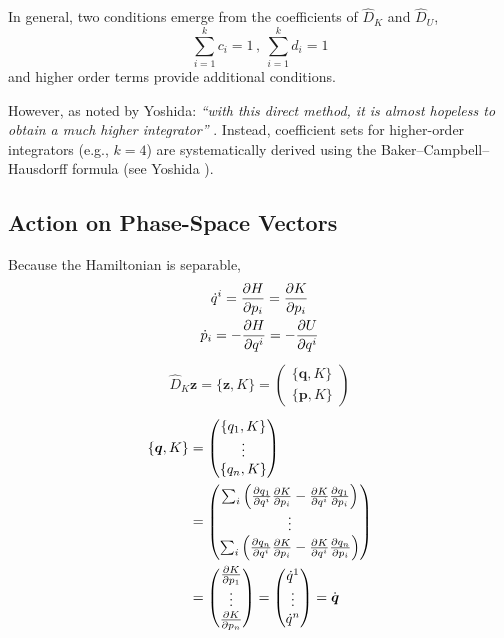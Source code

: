 \documentclass{article}
\renewcommand{\vec}[1]{\boldsymbol{#1}}
\begin{document}
In general, two conditions emerge from the coefficients of $\hat{D}_K$ and $\hat{D}_U$,
\[ \sum_{i=1}^{k} c_i = 1 \, , \ \sum_{i=1}^{k} d_i = 1 \]
and higher order terms provide additional conditions.

However, as noted by Yoshida: \textit{``with this direct method, it is almost hopeless to obtain a much higher integrator''} \cite{YOSHIDA1990262}.
Instead, coefficient sets for higher-order integrators (e.g., $k=4$) are systematically derived using the Baker--Campbell--Hausdorff formula (see Yoshida \cite{YOSHIDA1990262}).

\subsection{Action on Phase-Space Vectors}
Because the Hamiltonian is separable,
\begin{gather*}
	\dot{q}^i = \pdv{H}{p_i} = \pdv{K}{p_i} \\
	\dot{p}_i = -\pdv{H}{q^i} = -\pdv{U}{q^i}
\end{gather*}
\begin{align*}
	\hat{D}_K \vec{z} = \{ \vec{z}, K \} =
	\begin{pmatrix}
		\{ \vec{q}, K \} \\
		\{ \vec{p}, K \}
	\end{pmatrix} 
\end{align*}
\begin{align*}
	\{ \vec{q}, K \} &= 
	\begin{pmatrix}
		\{ q_1, K \} \\
		\vdots \\
		\{ q_n, K \}
	\end{pmatrix} \\
	&=
	\begin{pmatrix}
		\sum_i \left( \pdv{q_1}{q^i} \pdv{K}{p_i} - \pdv{K}{q^i} \pdv{q_1}{p_i} \right) \\
		\vdots \\
		\sum_i \left( \pdv{q_n}{q^i} \pdv{K}{p_i} - \pdv{K}{q^i} \pdv{q_n}{p_i} \right)
	\end{pmatrix} \\
	&=
	\begin{pmatrix}
		\pdv{K}{p_1} \\
		\vdots \\
		\pdv{K}{p_n}
	\end{pmatrix} =
	\begin{pmatrix}
		\dot{q}^1 \\
		\vdots \\
		\dot{q}^n
	\end{pmatrix}
	= \dot{\vec{q}}
\end{align*}
\end{document}
